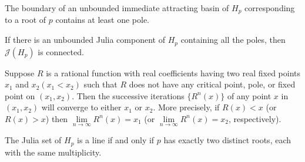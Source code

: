 \documentclass[10pt,a4paper]{amsart}
\begin{document}
\begin{lem}\label{bdry_pole}
The boundary of an unbounded immediate attracting basin of $H_p$ corresponding to a root of $p$ contains at least one pole.
\end{lem}

\begin{lem}\label{all_pole}
If there is an unbounded Julia component of $H_p$ containing all the poles, then $\mathcal{J}(H_p)$ is connected.
\end{lem}

\begin{lem}\label{gen_dyn}
Suppose $R$ is a rational function with real coefficients having two real fixed points $x_{1}$ and $x_{2}\left(x_{1}<x_{2}\right)$ such that $R$ does not have any critical point, pole, or fixed point on $(x_{1}, x_{2})$. Then  the successive iterations $\{R^n(x)\}$ of any point $x$ in $(x_{1}, x_{2})$ will converge to either $x_{1}$ or $x_{2}$. More precisely, if $R(x)<x$ (or $R(x)>x$) then $\lim\limits_{n \to \infty} R^n(x)=x_1$ (or $\lim\limits_{n \to \infty} R^n(x)=x_2$, respectively).
\end{lem}

\begin{maintheorem}\label{exact2}
	The Julia set of $H_p$ is a line if and only if $p$ has exactly two distinct roots, each with the same multiplicity.
\end{maintheorem}
\end{document}
